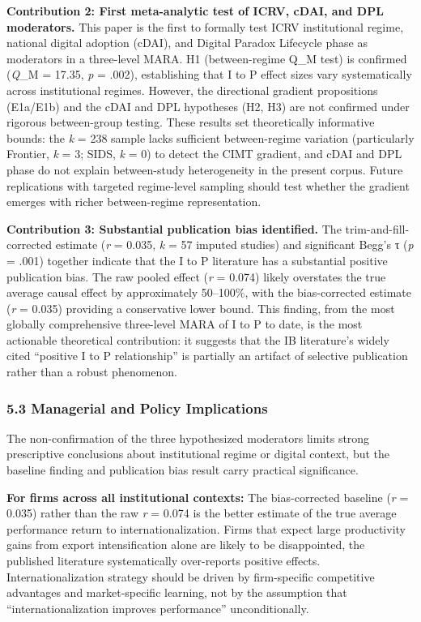 \documentclass[
  12pt,a4paper]{article}
\begin{document}
\textbf{Contribution 2: First meta-analytic test of ICRV, cDAI, and DPL
moderators.} This paper is the first to formally test ICRV institutional
regime, national digital adoption (cDAI), and Digital Paradox Lifecycle
phase as moderators in a three-level MARA. H1 (between-regime Q\_M test)
is confirmed (\emph{Q}\_M = 17.35, \emph{p} = .002), establishing that I
to P effect sizes vary systematically across institutional regimes.
However, the directional gradient propositions (E1a/E1b) and the cDAI
and DPL hypotheses (H2, H3) are not confirmed under rigorous
between-group testing. These results set theoretically informative
bounds: the \emph{k} = 238 sample lacks sufficient between-regime
variation (particularly Frontier, \emph{k} = 3; SIDS, \emph{k} = 0) to
detect the CIMT gradient, and cDAI and DPL phase do not explain
between-study heterogeneity in the present corpus. Future replications
with targeted regime-level sampling should test whether the gradient
emerges with richer between-regime representation.

\textbf{Contribution 3: Substantial publication bias identified.} The
trim-and-fill-corrected estimate (\emph{r} = 0.035, \emph{k} = 57
imputed studies) and significant Begg's τ (\emph{p} = .001) together
indicate that the I to P literature has a substantial positive
publication bias. The raw pooled effect (\emph{r} = 0.074) likely
overstates the true average causal effect by approximately 50--100\%,
with the bias-corrected estimate (\emph{r} = 0.035) providing a
conservative lower bound. This finding, from the most globally
comprehensive three-level MARA of I to P to date, is the most actionable
theoretical contribution: it suggests that the IB literature's widely
cited ``positive I to P relationship'' is partially an artifact of
selective publication rather than a robust phenomenon.

\hypertarget{managerial-and-policy-implications}{%
\subsubsection{5.3 Managerial and Policy
Implications}\label{managerial-and-policy-implications}}

The non-confirmation of the three hypothesized moderators limits strong
prescriptive conclusions about institutional regime or digital context,
but the baseline finding and publication bias result carry practical
significance.

\textbf{For firms across all institutional contexts:} The bias-corrected
baseline (\emph{r} = 0.035) rather than the raw \emph{r} = 0.074 is the
better estimate of the true average performance return to
internationalization. Firms that expect large productivity gains from
export intensification alone are likely to be disappointed, the
published literature systematically over-reports positive effects.
Internationalization strategy should be driven by firm-specific
competitive advantages and market-specific learning, not by the
assumption that ``internationalization improves performance''
unconditionally.
\end{document}
